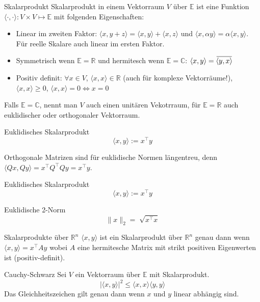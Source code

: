 \documentclass[a4paper,10pt]{article}
\def\R{\mathbb{R}}
\newcommand{\overbar}[1]{\mkern 1.5mu\overline{\mkern-1.5mu#1\mkern-1.5mu}\mkern 1.5mu}
\begin{document}
\begin{subbox}{Skalarprodukt}
  Skalarprodukt in einem Vektorraum $V$ über $\mathbb{E}$ ist eine Funktion $\langle \cdot, \cdot \rangle : V \times V \mapsto \mathbb{E}$ mit folgenden Eigenschaften:
  \begin{itemize}
    \item Linear im zweiten Faktor: $\langle x, y + z \rangle = \langle x, y \rangle + \langle x, z \rangle$ und $\langle x, \alpha y \rangle = \alpha \langle x, y \rangle$. Für reelle Skalare auch linear im ersten Faktor.
    \item  Symmetrisch wenn $\mathbb{E} = \mathbb{R}$ und hermitesch wenn $\mathbb{E} = \mathbb{C}$: $\langle x, y \rangle = \overbar{\langle y, x \rangle}$
    \item Positiv definit: $\forall x \in V$, $\langle x, x \rangle \in \mathbb{R}$ (auch für komplexe Vektorräume!), $\langle x, x \rangle \geq 0$, $\langle x, x \rangle = 0 \Leftrightarrow x = 0$
  \end{itemize}
  Falls $\mathbb{E} = \mathbb{C}$, nennt man $V$ auch einen unitären Vekotrraum, für $\mathbb{E} = \mathbb{R}$ auch euklidischer oder orthogonaler Vektorraum.
\end{subbox}

\begin{subbox}{Euklidisches Skalarprodukt}
  $$\langle x, y \rangle := x^\top y$$
\end{subbox}

Orthogonale Matrizen sind für euklidische Normen längentreu, denn $\langle Qx, Qy \rangle = x^\top Q^\top Q y = x^\top y$.

\begin{subbox}{Euklidisches Skalarprodukt}
  $$\langle x, y \rangle := x^\top y$$
\end{subbox}

\begin{subbox}{Euklidische 2-Norm}
  $$\lVert x \rVert_2 = \sqrt[]{x^\top x}$$
\end{subbox}

\begin{subbox}{Skalarprodukte über $\R^n$}
  $\langle x, y \rangle$ ist ein Skalarprodukt über $\R^n$ genau dann wenn $\langle x, y \rangle = x^\top A y$ wobei $A$ eine hermitesche Matrix mit strikt positiven Eigenwerten ist (positiv-definit).
\end{subbox}

\begin{mainbox}{Cauchy-Schwarz}
  Sei $V$ ein Vektorraum über $\mathbb{E}$ mit Skalarprodukt.
  $$| \langle x, y \rangle | ^2 \leq \langle x, x \rangle \langle y, y \rangle$$
  Das Gleichheitszeichen gilt genau dann wenn $x$ und $y$ linear abhängig sind.
\end{mainbox}
\end{document}
